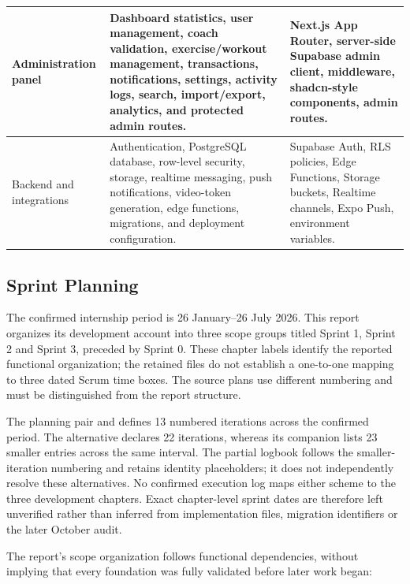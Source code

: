 \documentclass[12pt,a4paper,openany]{report}
\begin{document}
\begin{longtable}{|L{3.67cm}|L{5.29cm}|L{5.73cm}|}
Administration panel & Dashboard statistics, user management, coach validation, exercise/workout management, transactions, notifications, settings, activity logs, search, import/export, analytics, and protected admin routes. & Next.js App Router, server-side Supabase admin client, middleware, shadcn-style components, admin routes. \\ \hline
Backend and integrations & Authentication, PostgreSQL database, row-level security, storage, realtime messaging, push notifications, video-token generation, edge functions, migrations, and deployment configuration. & Supabase Auth, RLS policies, Edge Functions, Storage buckets, Realtime channels, Expo Push, environment variables. \\ \hline
\end{longtable}
\endgroup

\subsection{Sprint Planning}


The confirmed internship period is 26 January--26 July 2026. This report organizes its development account into three scope groups titled Sprint 1, Sprint 2 and Sprint 3, preceded by Sprint 0. These chapter labels identify the reported functional organization; the retained files do not establish a one-to-one mapping to three dated Scrum time boxes. The source plans use different numbering and must be distinguished from the report structure.

The planning pair  and  defines 13 numbered iterations across the confirmed period. The alternative  declares 22 iterations, whereas its companion  lists 23 smaller entries across the same interval. The partial logbook follows the smaller-iteration numbering and retains identity placeholders; it does not independently resolve these alternatives. No confirmed execution log maps either scheme to the three development chapters. Exact chapter-level sprint dates are therefore left unverified rather than inferred from implementation files, migration identifiers or the later October audit.

The report's scope organization follows functional dependencies, without implying that every foundation was fully validated before later work began:
\end{document}
